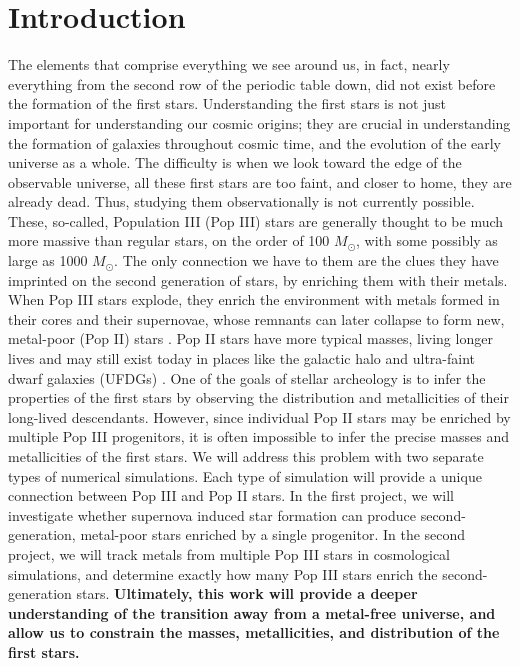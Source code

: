 \documentclass[letterpaper, 12pt]{article}
\begin{document}
\pagebreak


\thispagestyle{fancyplain}

\section{Introduction}

The elements that comprise everything we see around us, in fact, nearly everything from the second row of the periodic table down, did not exist before the formation of the first stars. Understanding the first stars is not just important for understanding our cosmic origins; they are crucial in understanding the formation of galaxies throughout cosmic time, and the evolution of the early universe as a whole. The difficulty is when we look toward the edge of the observable universe, all these first stars are too faint, and closer to home, they are already dead. Thus, studying them observationally is not currently possible. These, so-called, Population III (Pop III) stars are generally thought to be much more massive than regular stars, on the order of 100 $M_{\odot}$, with some possibly as large as 1000 $M_{\odot}$. The only connection we have to them are the clues they have imprinted on the second generation of stars, by enriching them with their metals. When Pop III stars explode, they enrich the environment with metals formed in their cores and their supernovae, whose remnants can later collapse to form new, metal-poor (Pop II) stars \citep{Chiaki2019}. Pop II stars have more typical masses, living longer lives and may still exist today in places like the galactic halo and ultra-faint dwarf galaxies (UFDGs) \citep{Kirby2008}. One of the goals of stellar archeology is to infer the properties of the first stars by observing the distribution and metallicities of their long-lived descendants. However, since individual Pop II stars may be enriched by multiple Pop III progenitors, it is often impossible to infer the precise masses and metallicities of the first stars. We will address this problem with two separate types of numerical simulations. Each type of simulation will provide a unique connection between Pop III and Pop II stars. In the first project, we will investigate whether supernova induced star formation can produce second-generation, metal-poor stars enriched by a single progenitor. In the second project, we will track metals from multiple Pop III stars in cosmological simulations, and determine exactly how many Pop III stars enrich the second-generation stars. \textbf{Ultimately, this work will provide a deeper understanding of the transition away from a metal-free universe, and allow us to constrain the masses, metallicities, and distribution of the first stars.}
\end{document}
